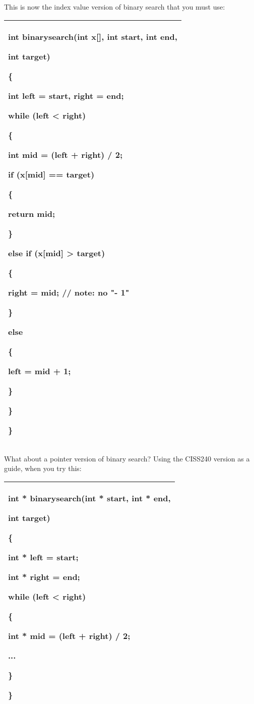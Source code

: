 \documentclass[
]{article}
\begin{document}
This is now the index value version of binary search that you must use:

\begin{longtable}[]{@{}l@{}}
\toprule
\endhead
\begin{minipage}[t]{0.97\columnwidth}\raggedright
int binarysearch(int x{[}{]}, int start, int end,

int target)

\{

int left = start, right = end;

while (left \textless{} right)

\{

int mid = (left + right) / 2;

if (x{[}mid{]} == target)

\{

return mid;

\}

else if (x{[}mid{]} \textgreater{} target)

\{

right = mid; // note: no "- 1"

\}

else

\{

left = mid + 1;

\}

\}

\}\strut
\end{minipage}\tabularnewline
\bottomrule
\end{longtable}

What about a pointer version of binary search? Using the CISS240 version
as a guide, when you try this:

\begin{longtable}[]{@{}l@{}}
\toprule
\endhead
\begin{minipage}[t]{0.97\columnwidth}\raggedright
int * binarysearch(int * start, int * end,

int target)

\{

int * left = start;

int * right = end;

while (left \textless{} right)

\{

int * mid = (left + right) / 2;

...

\}

\}\strut
\end{minipage}\tabularnewline
\bottomrule
\end{longtable}
\end{document}
